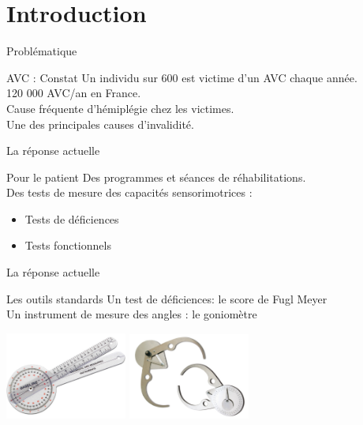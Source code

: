 \section{Introduction}
\begin{frame}{Problématique}
	\begin{alertblock}{AVC : Constat}
		Un individu sur 600 est victime d'un AVC chaque année. \\
		120 000 AVC/an en France. \\ \pause 
		Cause fréquente d'hémiplégie chez les victimes. \\
		Une des principales causes d'invalidité.
	\end{alertblock}
\end{frame}

\begin{frame}{La réponse actuelle}
	\begin{block}{Pour le patient}
	Des programmes et séances de réhabilitations.\\
	Des tests de mesure des capacités sensorimotrices :
		\begin{itemize}
			\item Tests de déficiences
			\item Tests fonctionnels
		\end{itemize}
	\end{block}
\end{frame}

\begin{frame}{La réponse actuelle}
	\begin{block}{Les outils standards}
		Un test de déficiences: le score de Fugl Meyer \\
		Un instrument de mesure des angles : le goniomètre
		\end{block}
		\begin{center}
			\includegraphics[width=4cm]{../images/goniometre.jpg}
			\includegraphics[width=4cm]{../images/clockprop.jpg}
	\end{center}
\end{frame}


